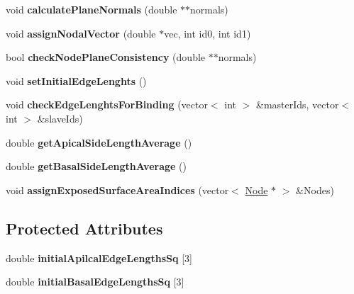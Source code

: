 \begin{DoxyCompactItemize}
\item 
\hypertarget{classPrism_a6b273d198e94039758a027b0dfb2c8af}{}void {\bfseries calculate\+Plane\+Normals} (double $\ast$$\ast$normals)\label{classPrism_a6b273d198e94039758a027b0dfb2c8af}

\item 
\hypertarget{classPrism_a13de4e8cefb58b3a33de4c2f7265a3b0}{}void {\bfseries assign\+Nodal\+Vector} (double $\ast$vec, int id0, int id1)\label{classPrism_a13de4e8cefb58b3a33de4c2f7265a3b0}

\item 
\hypertarget{classPrism_ac9695169749356654e847a022ce29aff}{}bool {\bfseries check\+Node\+Plane\+Consistency} (double $\ast$$\ast$normals)\label{classPrism_ac9695169749356654e847a022ce29aff}

\item 
\hypertarget{classPrism_a19996bf8336c7c6d3fc11bdc45bf8992}{}void {\bfseries set\+Initial\+Edge\+Lenghts} ()\label{classPrism_a19996bf8336c7c6d3fc11bdc45bf8992}

\item 
\hypertarget{classPrism_abcf0aff592566c074a782469b35558e1}{}void {\bfseries check\+Edge\+Lenghts\+For\+Binding} (vector$<$ int $>$ \&master\+Ids, vector$<$ int $>$ \&slave\+Ids)\label{classPrism_abcf0aff592566c074a782469b35558e1}

\item 
\hypertarget{classPrism_acc59ccf5e1b5f459a8fb871c2a78fe8e}{}double {\bfseries get\+Apical\+Side\+Length\+Average} ()\label{classPrism_acc59ccf5e1b5f459a8fb871c2a78fe8e}

\item 
\hypertarget{classPrism_a628c31f0b9dbaa6a1fee8adb68cb6cd6}{}double {\bfseries get\+Basal\+Side\+Length\+Average} ()\label{classPrism_a628c31f0b9dbaa6a1fee8adb68cb6cd6}

\item 
\hypertarget{classPrism_a17ac2aef2463ce01009f826d9f02c4b3}{}void {\bfseries assign\+Exposed\+Surface\+Area\+Indices} (vector$<$ \hyperlink{classNode}{Node} $\ast$ $>$ \&Nodes)\label{classPrism_a17ac2aef2463ce01009f826d9f02c4b3}

\end{DoxyCompactItemize}
\subsection*{Protected Attributes}
\begin{DoxyCompactItemize}
\item 
\hypertarget{classPrism_a8852b1bc7b1b3c616c257170772c32cb}{}double {\bfseries initial\+Apilcal\+Edge\+Lengths\+Sq} \mbox{[}3\mbox{]}\label{classPrism_a8852b1bc7b1b3c616c257170772c32cb}

\item 
\hypertarget{classPrism_a9f1fc00413e365495117d6faaf3ec278}{}double {\bfseries initial\+Basal\+Edge\+Lengths\+Sq} \mbox{[}3\mbox{]}\label{classPrism_a9f1fc00413e365495117d6faaf3ec278}

\end{DoxyCompactItemize}

